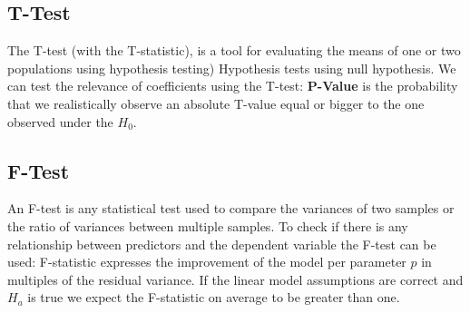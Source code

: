 \documentclass[../Main.tex]{subfiles}
\begin{document}
\subsection{T-Test}
The T-test (with the T-statistic), is a tool for evaluating the means of one or two populations using hypothesis testing) Hypothesis tests using null hypothesis. We can test the relevance of coefficients using the T-test:
\textbf{P-Value} is the probability that we realistically observe an absolute T-value equal or bigger to the one observed under the \(H_0\).

\subsection{F-Test}
An F-test is any statistical test used to compare the variances of two samples or the ratio of variances between multiple samples. To check if there is any relationship between predictors and the dependent variable the F-test can be used:
F-statistic expresses the improvement of the model per parameter \(p\) in multiples of the residual variance. If the linear model assumptions are correct and \(H_a\) is true we expect the F-statistic on average to be greater than one.
\end{document}
